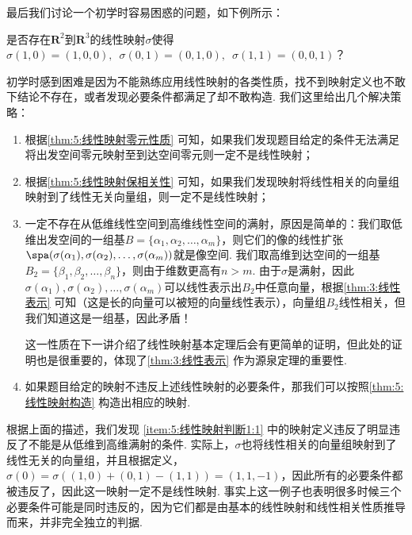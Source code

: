 最后我们讨论一个初学时容易困惑的问题，如下例所示：
\begin{example}\label{ex:5:线性映射判断1}
    是否存在$\mathbf{R}^2$到$\mathbf{R}^3$的线性映射$\sigma$使得$\sigma(1,0)=(1,0,0),\enspace\sigma(0,1)=(0,1,0),\enspace\sigma(1,1)=(0,0,1)$？
\end{example}

初学时感到困难是因为不能熟练应用线性映射的各类性质，找不到映射定义也不敢下结论不存在，或者发现必要条件都满足了却不敢构造. 我们这里给出几个解决策略：
\begin{enumerate}
    \item \label{item:5:线性映射判断1:1}
          根据\autoref{thm:5:线性映射零元性质} 可知，如果我们发现题目给定的条件无法满足将出发空间零元映射至到达空间零元则一定不是线性映射；

    \item \label{item:5:线性映射判断1:2}
          根据\autoref{thm:5:线性映射保相关性} 可知，如果我们发现映射将线性相关的向量组映射到了线性无关向量组，则一定不是线性映射；

    \item \label{item:5:线性映射判断1:3}
          一定不存在从低维线性空间到高维线性空间的满射，原因是简单的：我们取低维出发空间的一组基$B=\{\alpha_1,\alpha_2,\ldots,\alpha_m\}$，则它们的像的线性扩张$\spa(\sigma(\alpha_1),\sigma(\alpha_2),\ldots,\sigma(\alpha_m))$就是像空间. 我们取高维到达空间的一组基$B_2=\{\beta_1,\beta_2,\ldots,\beta_n\}$，则由于维数更高有$n>m$. 由于$\sigma$是满射，因此$\sigma(\alpha_1),\sigma(\alpha_2),\ldots,\sigma(\alpha_m)$可以线性表示出$B_2$中任意向量，根据\autoref{thm:3:线性表示} 可知（这是长的向量可以被短的向量线性表示），向量组$B_2$线性相关，但我们知道这是一组基，因此矛盾！

          这一性质在下一讲介绍了线性映射基本定理后会有更简单的证明，但此处的证明也是很重要的，体现了\autoref{thm:3:线性表示} 作为源泉定理的重要性.

    \item 如果题目给定的映射不违反上述线性映射的必要条件，那我们可以按照\autoref{thm:5:线性映射构造} 构造出相应的映射.
\end{enumerate}

根据上面的描述，我们发现 \ref*{item:5:线性映射判断1:1} 中的映射定义违反了明显违反了不能是从低维到高维满射的条件. 实际上，$\sigma$也将线性相关的向量组映射到了线性无关的向量组，并且根据定义，$\sigma(0)=\sigma((1,0)+(0,1)-(1,1))=(1,1,-1)$，因此所有的必要条件都被违反了，因此这一映射一定不是线性映射. 事实上这一例子也表明很多时候三个必要条件可能是同时违反的，因为它们都是由基本的线性映射和线性相关性质推导而来，并非完全独立的判据.


